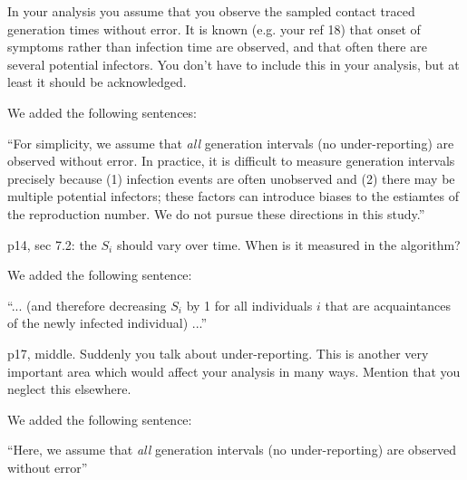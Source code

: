 \documentclass[12pt]{article}
\newcommand{\revtext}{\textsf}
\begin{document}
\revtext{In your analysis you assume that you observe the sampled contact traced generation times without error. It is known (e.g. your ref 18) that onset of symptoms rather than infection time are observed, and that often there are several potential infectors. You don't have to include this in your analysis, but at least it should be acknowledged.}

We added the following sentences:

``For simplicity, we assume that \emph{all} generation intervals (no under-reporting) are observed without error.
In practice, it is difficult to measure generation intervals precisely because (1) infection events are often unobserved and (2) there may be multiple potential infectors; these factors can introduce biases to the estiamtes of the reproduction number.
We do not pursue these directions in this study.''

\revtext{p14, sec 7.2: the $S_i$ should vary over time. When is it measured in the algorithm?}

We added the following sentence:

``... (and therefore decreasing $S_i$ by 1 for all individuals $i$ that are acquaintances of the newly infected individual) ...''

\revtext{p17, middle. Suddenly you talk about under-reporting. This is another very important area which would affect your analysis in many ways. Mention that you neglect this elsewhere.
}

We added the following sentence:

``Here, we assume that \emph{all} generation intervals (no under-reporting) are observed without error''
\end{document}
